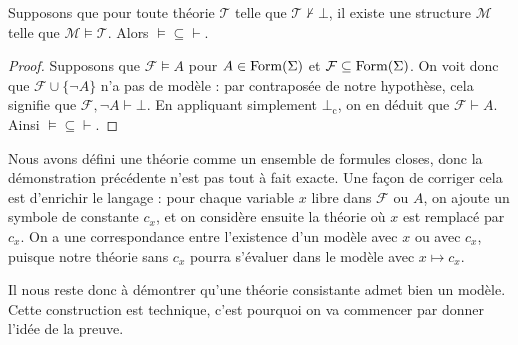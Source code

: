 \begin{lemma}
  Supposons que pour toute théorie $\mathcal T$ telle que
  $\mathcal T\not\vdash\bot$, il existe une structure $\mathcal M$ telle que
  $\mathcal M\models \mathcal T$. Alors $\vDash\subseteq\vdash$.
\end{lemma}

\begin{proof}
  Supposons que $\mathcal F\vDash A$ pour $A\in\operatorname{Form}(\Sigma)$ et
  $\mathcal F\subseteq\operatorname{Form}(\Sigma)$. On voit donc que
  $\mathcal F\cup\{\lnot A\}$ n'a pas de modèle : par contraposée de notre
  hypothèse, cela signifie que $\mathcal F,\lnot A\vdash \bot$. En appliquant
  simplement $\bot_\mathrm c$, on en déduit que $\mathcal F\vdash A$. Ainsi
  $\vDash\subseteq\vdash$.
\end{proof}

\begin{remark}
  Nous avons défini une théorie comme un ensemble de formules closes, donc la
  démonstration précédente n'est pas tout à fait exacte. Une façon de corriger
  cela est d'enrichir le langage : pour chaque variable $x$ libre dans
  $\mathcal F$ ou $A$, on ajoute un symbole de constante $c_x$, et on considère
  ensuite la théorie où $x$ est remplacé par $c_x$. On a une correspondance entre
  l'existence d'un modèle avec $x$ ou avec $c_x$, puisque notre théorie sans
  $c_x$ pourra s'évaluer dans le modèle avec $x\mapsto c_x$.
\end{remark}

Il nous reste donc à démontrer qu'une théorie consistante admet bien un modèle.
Cette construction est technique, c'est pourquoi on va commencer par donner
l'idée de la preuve.


